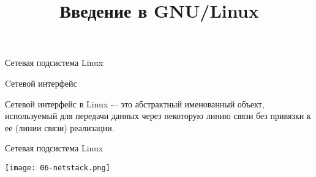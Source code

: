 
\title{Введение в GNU/Linux}








\frame{
	\tableofcontents
}

\begin{frame}{Сетевая подсистема Linux}

	\begin{block}{Cетевой интерфейс}

		Сетевой интерфейс в Linux -– это абстрактный именованный объект,  используемый для передачи 
		данных через некоторую линию связи без привязки к ее (линии связи) реализации.
	\end{block}
\end{frame}

\begin{frame}{Сетевая подсистема Linux}

	\center\texttt{[image: 06-netstack.png]}

\end{frame}

